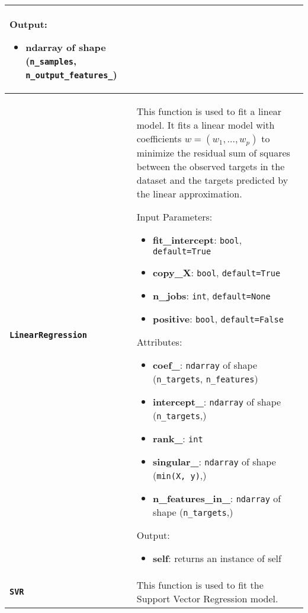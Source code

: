 \begin{longtable}{|l|p{12cm}|}
    Output:
    \begin{itemize}
        \item \textbf{ndarray} of shape (\texttt{n\_samples}, \texttt{n\_output\_features\_})
    \end{itemize}
    \\ \hline

    \textbf{\texttt{LinearRegression}} &
    This function is used to fit a linear model. It fits a linear model with coefficients $w = (w_1, ..., w_p)$ to minimize the residual sum of squares between the observed targets in the dataset and the targets predicted by the linear approximation.

    Input Parameters:
    \begin{itemize}
        \item \textbf{fit\_intercept}: \texttt{bool}, \texttt{default=True}
        \item \textbf{copy\_X}: \texttt{bool}, \texttt{default=True}
        \item \textbf{n\_jobs}: \texttt{int}, \texttt{default=None}
        \item \textbf{positive}: \texttt{bool}, \texttt{default=False}
    \end{itemize}

    Attributes:
    \begin{itemize}
        \item \textbf{coef\_}: \texttt{ndarray} of shape (\texttt{n\_targets}, \texttt{n\_features})
        \item \textbf{intercept\_}: \texttt{ndarray} of shape (\texttt{n\_targets},)
        \item \textbf{rank\_}: \texttt{int}
        \item \textbf{singular\_}: \texttt{ndarray} of shape (\texttt{min(X, y)},)
        \item \textbf{n\_features\_in\_}: \texttt{ndarray} of shape (\texttt{n\_targets},)
    \end{itemize}

    Output:
    \begin{itemize}
        \item \textbf{self}: returns an instance of self
    \end{itemize}
    \\ \hline

    \textbf{\texttt{SVR}} &
    This function is used to fit the Support Vector Regression model.


\end{longtable}
